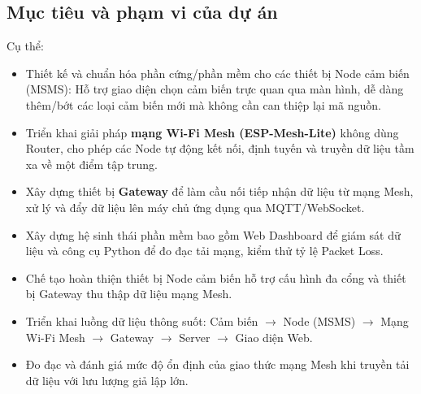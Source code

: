 \documentclass{article} %
\begin{document}
\subsection{Mục tiêu và phạm vi của dự án}
Cụ thể:
\begin{itemize}
    \item Thiết kế và chuẩn hóa phần cứng/phần mềm cho các thiết bị Node cảm biến (MSMS): Hỗ trợ giao diện chọn cảm biến trực quan qua màn hình, dễ dàng thêm/bớt các loại cảm biến mới mà không cần can thiệp lại mã nguồn.
    \item Triển khai giải pháp \textbf{mạng Wi-Fi Mesh (ESP-Mesh-Lite)} không dùng Router, cho phép các Node tự động kết nối, định tuyến và truyền dữ liệu tầm xa về một điểm tập trung.
    \item Xây dựng thiết bị \textbf{Gateway} để làm cầu nối tiếp nhận dữ liệu từ mạng Mesh, xử lý và đẩy dữ liệu lên máy chủ ứng dụng qua MQTT/WebSocket.
    \item Xây dựng hệ sinh thái phần mềm bao gồm Web Dashboard để giám sát dữ liệu và công cụ Python để đo đạc tải mạng, kiểm thử tỷ lệ Packet Loss.
\end{itemize}
\begin{itemize}
    \item Chế tạo hoàn thiện thiết bị Node cảm biến hỗ trợ cấu hình đa cổng và thiết bị Gateway thu thập dữ liệu mạng Mesh.
    \item Triển khai luồng dữ liệu thông suốt: Cảm biến $\rightarrow$ Node (MSMS) $\rightarrow$ Mạng Wi-Fi Mesh $\rightarrow$ Gateway $\rightarrow$ Server $\rightarrow$ Giao diện Web.
    \item Đo đạc và đánh giá mức độ ổn định của giao thức mạng Mesh khi truyền tải dữ liệu với lưu lượng giả lập lớn.
\end{itemize}
\end{document}
